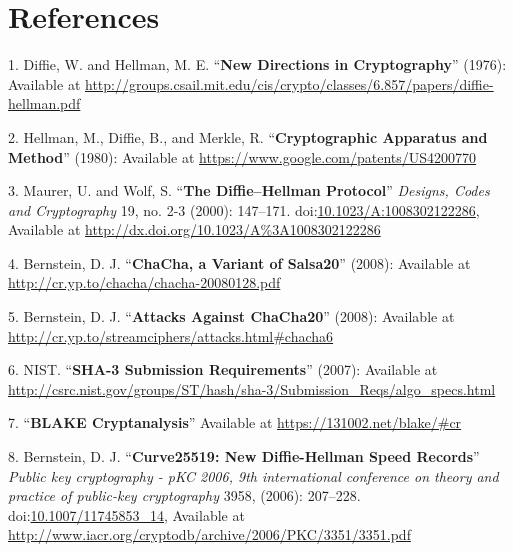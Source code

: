 \section*{References}\label{references}

1. Diffie, W. and Hellman, M. E. ``\textbf{New Directions in
Cryptography}'' (1976): Available at
\url{http://groups.csail.mit.edu/cis/crypto/classes/6.857/papers/diffie-hellman.pdf}

2. Hellman, M., Diffie, B., and Merkle, R. ``\textbf{Cryptographic
Apparatus and Method}'' (1980): Available at
\url{https://www.google.com/patents/US4200770}

3. Maurer, U. and Wolf, S. ``\textbf{The Diffie--Hellman Protocol}''
\emph{Designs, Codes and Cryptography} 19, no. 2-3 (2000): 147--171.
doi:\href{http://dx.doi.org/10.1023/A:1008302122286}{10.1023/A:1008302122286},
Available at \url{http://dx.doi.org/10.1023/A\%3A1008302122286}

4. Bernstein, D. J. ``\textbf{ChaCha, a Variant of Salsa20}'' (2008):
Available at \url{http://cr.yp.to/chacha/chacha-20080128.pdf}

5. Bernstein, D. J. ``\textbf{Attacks Against ChaCha20}'' (2008):
Available at \url{http://cr.yp.to/streamciphers/attacks.html\#chacha6}

6. NIST. ``\textbf{SHA-3 Submission Requirements}'' (2007): Available at
\url{http://csrc.nist.gov/groups/ST/hash/sha-3/Submission_Reqs/algo_specs.html}

7. ``\textbf{BLAKE Cryptanalysis}'' Available at
\url{https://131002.net/blake/\#cr}

8. Bernstein, D. J. ``\textbf{Curve25519: New Diffie-Hellman Speed
Records}'' \emph{Public key cryptography - pKC 2006, 9th international
conference on theory and practice of public-key cryptography} 3958,
(2006): 207--228.
doi:\href{http://dx.doi.org/10.1007/11745853_14}{10.1007/11745853\_14},
Available at
\url{http://www.iacr.org/cryptodb/archive/2006/PKC/3351/3351.pdf} 

